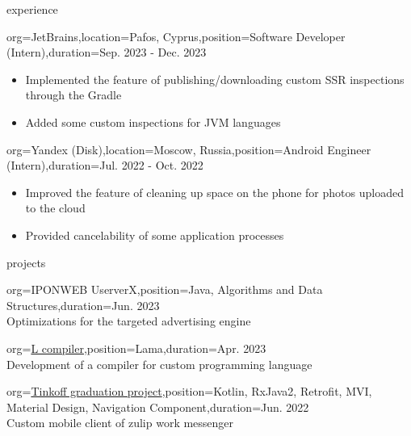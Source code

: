 \documentclass{resume}
\begin{document}
\begin{ResumeSection}{experience}
	    \begin{ResumeSubsection}{org=JetBrains,location={Pafos, Cyprus},position={Software Developer (Intern)},duration=Sep. 2023 - Dec. 2023}
        \begin{itemize}
            \item Implemented the feature of publishing/downloading custom SSR inspections through the Gradle
            \item Added some custom inspections for JVM languages
        \end{itemize}
    \end{ResumeSubsection}
    \begin{ResumeSubsection}{org=Yandex (Disk),location={Moscow, Russia},position={Android Engineer (Intern)},duration=Jul. 2022 - Oct. 2022} 
        \begin{itemize}
            \item Improved the feature of cleaning up space on the phone for photos uploaded to the cloud
            \item Provided cancelability of some application processes
        \end{itemize}
    \end{ResumeSubsection}
\end{ResumeSection}

\begin{ResumeSection}{projects}
\begin{ResumeSubsection}{org=IPONWEB UserverX,position={Java, Algorithms and Data Structures},duration={Jun. 2023}} \\
Optimizations for the targeted advertising engine \vspace{4pt}

\end{ResumeSubsection}

	\begin{ResumeSubsection}{org=\href{https://github.com/Hardes1/compilers-supplementary}{L compiler},position={Lama},duration={Apr. 2023}} \\
	Development of a compiler for custom programming language
 \vspace{4pt}

\end{ResumeSubsection}
	\begin{ResumeSubsection}{org=\href{https://github.com/Hardes1/ZulipClient}{Tinkoff graduation project},position={Kotlin, RxJava2, Retrofit, MVI, Material Design, Navigation Component},duration={Jun. 2022}} \\
Custom mobile client of zulip work messenger \vspace{4pt}
\end{ResumeSubsection}
\end{ResumeSection}
\end{document}
